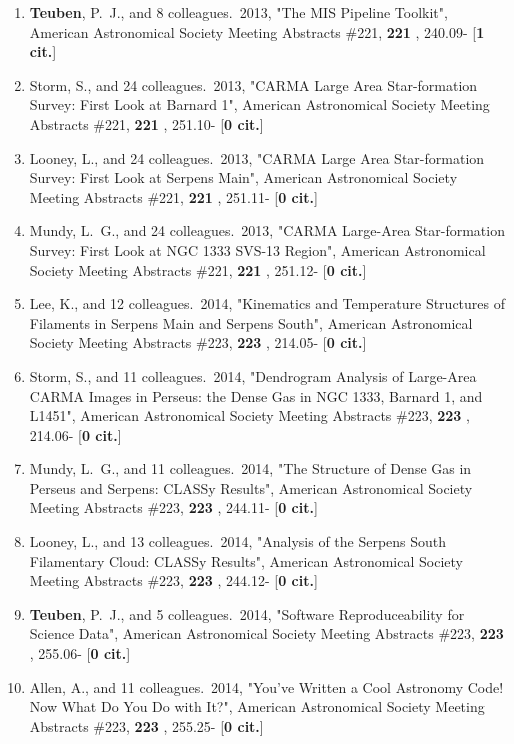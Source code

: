 \documentclass[11pt,letterpaper]{article}
\begin{document}
\begin{enumerate}[resume,label=\textbf{\arabic*}.]
\item  
{\bf Teuben}, P.~J., and 8 colleagues.\  2013,  "The MIS Pipeline Toolkit", 
American Astronomical Society Meeting Abstracts \#221,  {\bf 221} , 240.09- 
[{\bf 1 cit.}] 
\item  
Storm, S., and 24 colleagues.\  2013,  "CARMA Large Area Star-formation 
Survey: First Look at Barnard 1", American Astronomical Society Meeting 
Abstracts \#221,  {\bf 221} , 251.10- [{\bf 0 cit.}] 

\item  
Looney, L., and 24 colleagues.\  2013,  "CARMA Large Area Star-formation 
Survey: First Look at Serpens Main", American Astronomical Society Meeting 
Abstracts \#221,  {\bf 221} , 251.11- [{\bf 0 cit.}] 

\item  
Mundy, L.~G., and 24 colleagues.\  2013,  "CARMA Large-Area Star-formation 
Survey: First Look at NGC 1333 SVS-13 Region", American Astronomical 
Society Meeting Abstracts \#221,  {\bf 221} , 251.12- [{\bf 0 cit.}] %
\item  
Lee, K., and 12 colleagues.\  2014,  "Kinematics and Temperature Structures 
of Filaments in Serpens Main and Serpens South", American Astronomical 
Society Meeting Abstracts \#223,  {\bf 223} , 214.05- [{\bf 0 cit.}] 

\item  
Storm, S., and 11 colleagues.\  2014,  "Dendrogram Analysis of Large-Area 
CARMA Images in Perseus: the Dense Gas in NGC 1333, Barnard 1, and L1451", 
American Astronomical Society Meeting Abstracts \#223,  {\bf 223} , 214.06- 
[{\bf 0 cit.}]


\item  
Mundy, L.~G., and 11 colleagues.\  2014,  "The Structure of Dense Gas in 
Perseus and Serpens: CLASSy Results", American Astronomical Society Meeting 
Abstracts \#223,  {\bf 223} , 244.11- [{\bf 0 cit.}] 

\item  
Looney, L., and 13 colleagues.\  2014,  "Analysis of the Serpens South 
Filamentary Cloud: CLASSy Results", American Astronomical Society Meeting 
Abstracts \#223,  {\bf 223} , 244.12- [{\bf 0 cit.}] 

\item  
{\bf Teuben}, P.~J., and 5 colleagues.\  2014,  "Software Reproduceability for 
Science Data", American Astronomical Society Meeting Abstracts \#223,  {\bf 
223} , 255.06- [{\bf 0 cit.}] 
\item  
Allen, A., and 11 colleagues.\  2014,  "You've Written a Cool Astronomy 
Code! Now What Do You Do with It?", American Astronomical Society Meeting 
Abstracts \#223,  {\bf 223} , 255.25- [{\bf 0 cit.}]


\end{enumerate}
\end{document}
